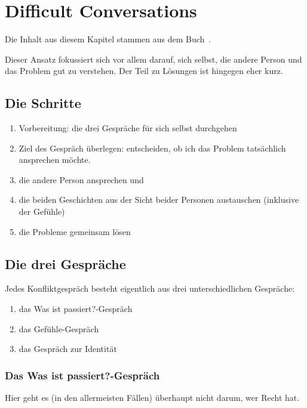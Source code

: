 \section{Difficult Conversations}

Die Inhalt aus diesem Kapitel stammen aus dem Buch~\cite{difficult-conversations}.

Dieser Ansatz fokussiert sich vor allem darauf, sich selbst, die andere Person und das Problem gut zu verstehen. Der Teil zu Lösungen ist hingegen eher kurz.


\subsection{Die Schritte}

\begin{enumerate}
  \item Vorbereitung: die drei Gespräche für sich selbst durchgehen
  \item Ziel des Gespräch überlegen: entscheiden, ob ich das Problem tatsächlich ansprechen möchte.
  \item die andere Person ansprechen und 
  \item die beiden Geschichten aus der Sicht beider Personen austauschen (inklusive der Gefühle)
  \item die Probleme gemeinsam lösen
\end{enumerate}


\subsection{Die drei Gespräche}

Jedes Konfliktgespräch besteht eigentlich aus drei unterschiedlichen Gespräche:

\begin{enumerate}
  \item das \glqq Was ist passiert?\grqq-Gespräch
  \item das Gefühle-Gespräch
  \item das Gespräch zur Identität
\end{enumerate}

\subsubsection{Das \glqq Was ist passiert?\grqq-Gespräch}

Hier geht es (in den allermeisten Fällen) überhaupt nicht darum, wer \glqq Recht hat\grqq.

